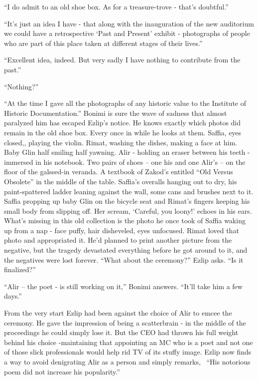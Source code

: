 \documentclass[twoside,11pt]{book}
\begin{document}
``I do admit to an old shoe box. As for a treasure-trove - that's doubtful.''

``It's just an idea I have - that along with the inauguration of the new auditorium we could have a
retrospective `Past and Present' exhibit - photographs of people who are part of this place taken at different stages
of their lives.''

``Excellent idea, indeed. But very sadly I have nothing to contribute from the past.''

``Nothing?''

``At the time I gave all the photographs of any historic value to the Institute of Historic
Documentation.'' Bonimi is sure the wave of sadness that almost paralyzed him has escaped Ezlip's
notice. He knows exactly which photos did remain in the old shoe box. Every once in while he looks at them. Saffia,
eyes closed,, playing the violin. Rimat, washing the dishes, making a face at him. Baby Glin half smiling half yawning.
Alir - holding an eraser between his teeth - immersed in his notebook. Two pairs of shoes -- one his
and one Alir's -- on the floor of the galssed-in veranda. A textbook of Zakod's entitled ``Old Versus
Obsolete'' in the middle of the table. Saffia's overalls hanging out to dry, his paint-spattered ladder
leaning against the wall, some cans and brushes next to it.  Saffia propping up baby Glin on the bicycle seat
and Rimat's fingers keeping his small body from slipping off.  Her scream, `Careful, you loony!' echoes in his ears.
What's missing in this old collection is the photo he once took of Saffia waking up from a nap - face puffy, hair
disheveled, eyes
unfocused.  Rimat loved that photo and appropriated it. He'd planned to print another picture from the negative, but
the tragedy devastated everything before he got around to it, and the negatives were lost forever. ``What
about the ceremony?'' Ezlip asks. ``Is it finalized?''

``Alir -- the poet - is still working on it,'' Bonimi answers. ``It'll take him a
few days.''

From the very start Ezlip had been against the choice of Alir to emcee the ceremony. He gave the impression of being a
scatterbrain - in the middle of the proceedings he could simply lose it. But the CEO had thrown his full weight behind
his choice -maintaining that appointing an MC who is a poet and not one of those slick professionals would help rid TV
of its stuffy image.  Ezlip now finds a way to avoid denigrating Alir as a person and simply remarks,
\ ``His notorious poem did not increase his popularity.''
\end{document}
